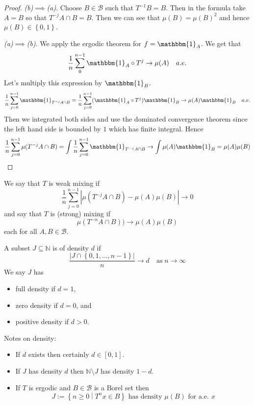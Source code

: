 \documentclass[11pt]{article}
\newcommand{\defeq}{:=}
\newcommand{\abs}[1]{\left|#1\right|}
\newcommand{\indic}[1]{\mathbbm{1}_{#1}}
\newcommand{\relmiddle}[1]{\mathrel{}\middle#1\mathrel{}}
\newcommand{\rmv}{\relmiddle|}
\newcommand{\N}{\mathbb{N}}
\newenvironment{defin}
	{\begin{mdframed}[backgroundcolor=white, roundcorner=5pt, linewidth=1pt, linecolor=RoyalBlue]}
	{\end{mdframed}}
\newcommand{\mdf}[1]{{\color{RoyalBlue} #1}}
\begin{document}
\begin{proof}
\textit{(b)}$\implies$\textit{(a)}.
Choose $B\in\mathcal{B}$ such that $T^{-1}B=B$.
Then in the formula take $A=B$ so that $T^{-j}A\cap B=B$.
Then we can see that $\mu(B)=\mu(B)^2$ and hence $\mu(B)\in\left\{ 0, 1\right\}$.

\textit{(a)}$\implies$\textit{(b)}.
We apply the ergodic theorem for $f=\indic{A}$.
We get that
\[
	\frac{1}{n}\sum_{0}^{n-1}\indic{A}\circ T^j \to \mu(A) \quad a.e.
\]
Let's multiply this expression by $\indic{B}$.
\[
	\frac{1}{n}\sum_{j=0}^{n-1}\indic{T^{-j}A\cap B} = \frac{1}{n}\sum_{j=0}^{n-1}(\indic{A}\circ T^j)\indic{B} \to \mu(A)\indic{B}\quad a.e.
\]
Then we integrated both sides and use the dominated convergence theorem since the left hand side is bounded by $1$ which has finite integral.
Hence
\[
	\frac{1}{n}\sum_{j=0}^{n-1}\mu(T^{-j}A\cap B) = \int \frac{1}{n}\sum_{j=0}^{n-1}\indic{T^{-j}A\cap B} \to \int \mu(A) \indic{B} = \mu(A) \mu(B)
\]
\end{proof}

\begin{defin}
	We say that $T$ is \mdf{weak mixing} if
	\[
		\frac{1}{n}\sum_{j=0}^{n-1}\abs{\mu(T^{-j}A\cap B) - \mu(A)\mu(B)} \to 0
	\]
	and say that $T$ is \mdf{(strong) mixing} if
	\[
		\mu(T^{-n}A\cap B)) \to \mu(A)\mu(B)
	\]
	each for all $A, B\in\mathcal{B}$.

	A subset $J\subseteq \N$ is of \mdf{density $d$} if
	\[
		\frac{\abs{J\cap \left\{ 0, 1, \dots , n-1\right\}}}{n}\to d\quad \text{as} \; n\to\infty
	\]
	We say $J$ has
	\begin{itemize}
		\item \mdf{full density} if $d=1$,
		\item \mdf{zero density} if $d=0$, and
		\item \mdf{positive density} if $d>0$.
	\end{itemize}
\end{defin}

Notes on density:
\begin{itemize}
	\item If $d$ exists then certainly $d\in \left[ 0, 1\right]$.
	\item If $J$ has density $d$ then $\N \setminus J$ has density $1-d$.
	\item If $T$ is ergodic and $B\in\mathcal{B}$ is a Borel set then
		\[
			J\defeq\left\{ n \geq 0 \rmv T^n x \in B\right\}\text{ has density }\mu(B) \text{ for a.e. }x
		\]
\end{itemize}
\end{document}
